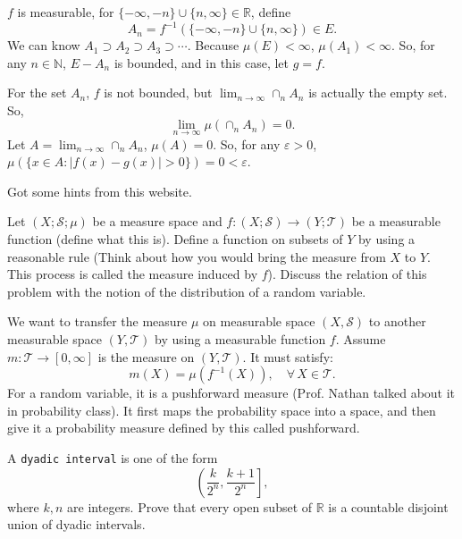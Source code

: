 \documentclass[12pt]{article}
\newenvironment{exercise}[1]{\begin{tcolorbox}[colback=black!15, colframe=black!80, breakable, title=#1]}{\end{tcolorbox}}
\newenvironment{proof}{\begin{tcolorbox}[colback=white, colframe=black!50, breakable, title=Proof. ]\setlength{\parskip}{0.8em}}{\,\\\rightline{$\square$}\end{tcolorbox}}
\newenvironment{solution}{\begin{tcolorbox}[colback=white, colframe=black!50, breakable, title=Solution. ]\setlength{\parskip}{0.8em}}{\end{tcolorbox}}
\begin{document}
    \begin{proof}
        $f$ is measurable, for $\{-\infty, -n\}\cup\{n,\infty\}\in\mathbb{R}$, define 
        \[A_n=f^{-1}(\{-\infty, -n\}\cup\{n,\infty\})\in E. \] 
        We can know $A_1\supset A_2\supset A_3\supset\cdots$. Because $\mu(E)<\infty$, $\mu(A_1)<\infty$. So, for any $n\in\mathbb{N}$, $E-A_n$ is bounded, and in this case, let $g=f$. 

        For the set $A_n$, $f$ is not bounded, but $\lim_{n\to\infty}\cap_nA_n$ is actually the empty set. So, \[\lim_{n\to\infty}\mu(\cap_nA_n)=0. \]
        Let $A=\lim_{n\to\infty}\cap_nA_n$, $\mu(A)=0$. So, for any $\varepsilon>0$, $\mu(\{x\in A:|f(x)-g(x)|>0\})=0<\varepsilon$. 

        Got some hints from this website. 
    \end{proof}

    \begin{exercise}{4}
        Let $(X; \mathscr{S}; \mu)$ be a measure space and $f : (X; \mathscr{S}) \to (Y; \mathscr{T} )$ be a measurable function (define what this is). Define a function on subsets of $Y$ by using a reasonable rule (Think about how you would bring the measure from $X$ to $Y$. This process is called the measure induced by $f$). Discuss the relation of this problem with the notion of the distribution of a random variable. 
    \end{exercise}

    \begin{solution}
        We want to transfer the measure $\mu$ on measurable space $(X,\mathscr{S})$ to another measurable space $(Y,\mathscr{T})$ by using a measurable function $f$. Assume $m: \mathscr{T}\to [0,\infty]$ is the measure on $(Y,\mathscr{T})$. It must satisfy: 
        \[m(X)=\mu(f^{-1}(X)),\quad \forall\, X\in\mathscr{T}. \]
        For a random variable, it is a pushforward measure (Prof. Nathan talked about it in probability class). It first maps the probability space into a space, and then give it a probability measure defined by this called pushforward. 
    \end{solution}

    \begin{exercise}{5}
        A \texttt{dyadic interval} is one of the form
        \[\left(\frac{k}{2^n}, \frac{k+1}{2^n}\right], \]
        where $k, n$ are integers. Prove that every open subset of $\mathbb{R}$ is a countable disjoint union of dyadic intervals. 
    \end{exercise}
\end{document}
